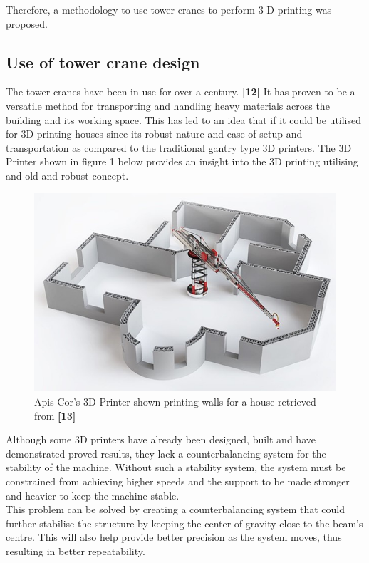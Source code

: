 \documentclass{UoNMCHA}
\numberwithin{equation}{section}
\begin{document}
	Therefore, a methodology to use tower cranes to perform 3-D printing was proposed.
	
	\subsection*{Use of tower crane design}
	
	The tower cranes have been in use for over a century. \textbf{[12]} It has proven to be a versatile method for transporting and handling heavy materials across the building and its working space. This has led to an idea that if it could be utilised for 3D printing houses since its robust nature and ease of setup and transportation as compared to the traditional gantry type 3D printers. The 3D Printer shown in figure 1 below provides an insight into the 3D printing utilising and old and robust concept. \\
	
	\begin{figure}[H]
		\begin{center}
			\includegraphics[width=.75\linewidth]{figs/Picture37}
			\caption{Apis Cor's 3D Printer shown printing walls for a house retrieved from \textbf{[13]}}
			\label{figs/Picture37}
		\end{center}
	\end{figure}
	
	Although some 3D printers have already been designed, built and have demonstrated proved results, they lack a counterbalancing system for the stability of the machine. Without such a stability system, the system must be constrained from achieving higher speeds and the support to be made stronger and heavier to keep the machine stable. \\
	This problem can be solved by creating a counterbalancing system that could further stabilise the structure by keeping the center of gravity close to the beam's centre. This will also help provide better precision as the system moves, thus resulting in better repeatability.
	
\end{document}
